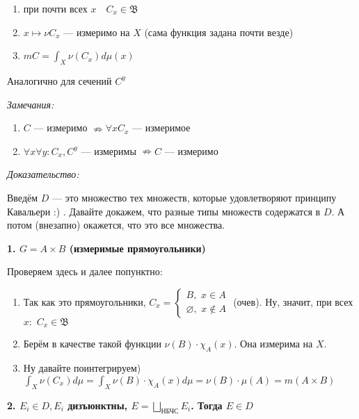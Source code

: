 \documentclass{article}
\def\dbl{\,\,}
\begin{document}
\begin{enumerate}
    \item при почти всех $x \quad C_{x} \in \mathfrak{B}$ 
    \item $x \mapsto \nu C_{x}$ --- измеримо на $X$ (сама функция задана почти везде)
    \item $m C = \int_{X} \nu (C_{x}) d\mu(x)$
\end{enumerate}

Аналогично для сечений $C^{y}$

\textit{Замечания:}
\begin{enumerate}
    \item $C$ --- измеримо $\nRightarrow \forall x C_x$ --- измеримое 
    \item $\forall x \forall y: C_x, C^y$ --- измеримы $\nRightarrow C$ --- измеримо
\end{enumerate}

\textit{Доказательство:}

Введём $D$ --- это множество тех множеств, которые удовлетворяют принципу Кавальери :) . Давайте докажем, что разные типы множеств содержатся в $D$. А потом (внезапно) окажется, что это все множества.

\textbf{1. $G = A \times B$ (измеримые прямоугольники)}

Проверяем здесь и далее попунктно:

\begin{enumerate}
    \item Так как это прямоугольники, $C_x = \begin{cases}
        B, \dbl x \in A\\
        \varnothing, \dbl x \notin A
        \end{cases}$ (очев). Ну, значит, при всех $x: \dbl C_x \in \mathfrak{B}$
    \item Берём в качестве такой функции $\nu(B) \cdot \chi_A(x)$. Она измерима на $X$.
    \item Ну давайте поинтегрируем) $\int_{X} \nu(C_x) d\mu = \int_{X} \nu(B) \cdot \chi_A(x) d\mu = \nu(B) \cdot \mu(A) = m(A \times B)$
\end{enumerate}

\textbf{2. $E_i \in D, E_i$ дизъюнктны, $E = \bigsqcup_{\text{НБЧС}} E_i$. Тогда $E \in D$}
\end{document}
